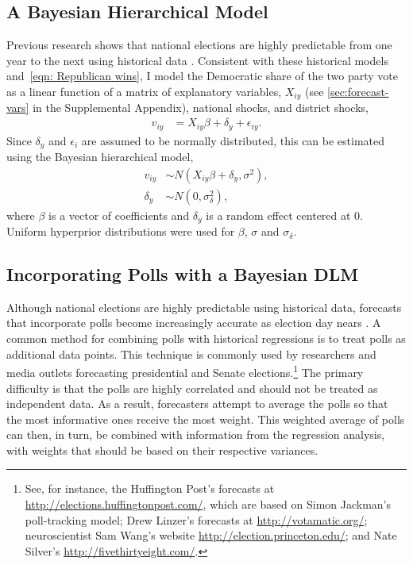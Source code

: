 \documentclass[12pt,final,fleqn]{article}
\theoremstyle{plain}
\begin{document}
\subsection{A Bayesian Hierarchical Model}
Previous research shows that national elections are highly predictable from one year to the next using historical data \citep[e.g.][]{campbell1992forecasting, gelman1993american, kastellec2008predicting}. Consistent with these historical models and~\autoref{eqn: Republican wins}, I model the Democratic share of the two party vote as a linear function of a matrix of explanatory variables, $X_{iy}$ (see \autoref*{sec:forecast-vars} in the Supplemental Appendix), national shocks, and district shocks,
\begin{align}
v_{iy}&= X_{iy}\beta + \delta_y + \epsilon_{iy}.
\end{align}
Since $\delta_y$ and $\epsilon_i$ are assumed to be normally distributed, this can be estimated using the Bayesian hierarchical model,
\begin{align}
v_{iy} &\sim N\left(X_{iy}\beta + \delta_y,  \sigma^2\right), \label{eqn: hierarchical linear model} \\
\delta_y &\sim N(0, \sigma^2_\delta), \label{eqn: hierarchical linear model time effects}
\end{align}
where $\beta$ is a vector of coefficients and $\delta_y$ is a random effect centered at 0. Uniform hyperprior distributions were used for $\beta$, $\sigma$ and $\sigma_\delta$.

\subsection{Incorporating Polls with a Bayesian DLM}
Although national elections are highly predictable using historical data, forecasts that incorporate polls become increasingly accurate as election day nears \citet{linzer2013dynamic}. A common method for combining polls with historical regressions is to treat polls as additional data points. This technique is commonly used by researchers and media outlets forecasting presidential and Senate elections.\footnote{See, for instance, the Huffington Post's forecasts at \url{http://elections.huffingtonpost.com/}, which are based on Simon Jackman's poll-tracking model; Drew Linzer's forecasts at \url{http://votamatic.org/}; neuroscientist Sam Wang's website \url{http://election.princeton.edu/}; and Nate Silver's \url{http://fivethirtyeight.com/}.} The primary difficulty is that the polls are highly correlated and should not be treated as independent data. As a result, forecasters attempt to average the polls so that the most informative ones receive the most weight. This weighted average of polls can then, in turn, be combined with information from the regression analysis, with weights that should be based on their respective variances.
\end{document}
